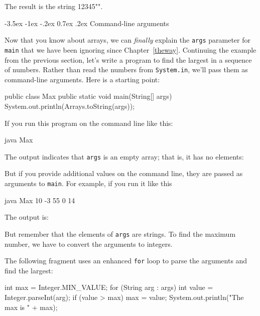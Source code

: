 \documentclass[12pt]{book}
\makeatletter
\theoremstyle{exercise}
\newcommand{\java}[1]{\verb"#1"}
\renewcommand{\section}{\@startsection{section}{1}{\z@}%
    {-3.5ex \@plus -1ex \@minus -.2ex}%
    {0.7ex \@plus.2ex}%
    {\normalfont\Large\bfseries}}
\newcommand{\java}[1]{\lstinline{#1}} %
\makeatother
\begin{document}
The result is the string \java{"12345"}.


\section{Command-line arguments}

Now that you know about arrays, we can {\em finally} explain the \java{args} parameter for \java{main} that we have been ignoring since Chapter~\ref{theway}.
Continuing the example from the previous section, let's write a program to find the largest in a sequence of numbers.
Rather than read the numbers from \java{System.in}, we'll pass them as command-line arguments.
Here is a starting point:

\begin{code}
public class Max {
    public static void main(String[] args) {
        System.out.println(Arrays.toString(args));
    }
}
\end{code}

If you run this program on the command line like this:

\begin{code}
java Max
\end{code}


The output indicates that \java{args} is an empty array; that is, it has no elements:

\begin{stdout}
[]
\end{stdout}

But if you provide additional values on the command line, they are passed as arguments to \java{main}.
For example, if you run it like this

\begin{stdout}
java Max 10 -3 55 0 14
\end{stdout}

The output is:

\begin{stdout}
[10, -3, 55, 0, 14]
\end{stdout}

But remember that the elements of \java{args} are strings.
To find the maximum number, we have to convert the arguments to integers.

The following fragment uses an enhanced \java{for} loop to parse the arguments and find the largest:

\begin{code}
    int max = Integer.MIN_VALUE;
    for (String arg : args) {
        int value = Integer.parseInt(arg);
        if (value > max) {
            max = value;
        }
    }
    System.out.println("The max is " + max);
\end{code}
\end{document}
